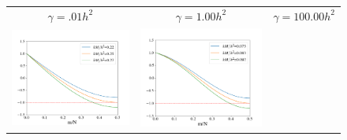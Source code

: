 \documentclass[12pt, reqno]{report}
\theoremstyle{definition}
\theoremstyle{remark}
\begin{document}
\begin{figure}[H] 
    \centering
    
    \begin{tabular}{ccc}
        $\gamma=.01h^2$ & $\gamma=1.00h^2$ & $\gamma=100.00h^2$ \\
        \includegraphics[width = \ampwidth]{media_paper/ga0.01_CH_FD.png} &
        \includegraphics[width = \ampwidth]{media_paper/ga1_CH_FD.png} &

\end{tabular}
\end{figure}
\end{document}

